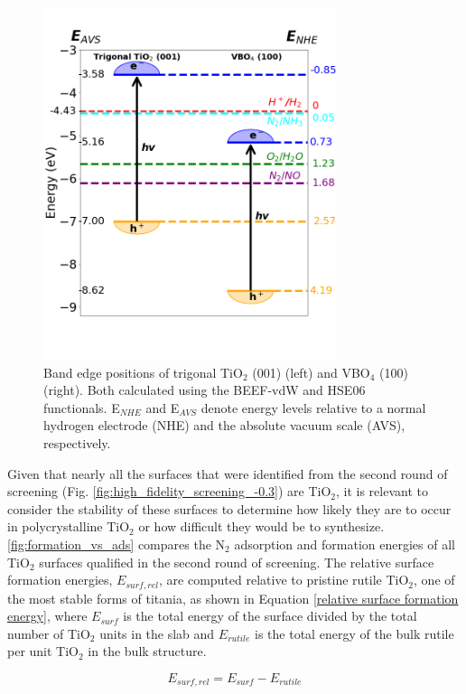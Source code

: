 \begin{figure}[h]
\centering
\includegraphics[width=8.6cm]{figures/metal_oxide_figures/Figure 8.png}

\caption{Band edge positions of trigonal TiO$_2$ (001) (left) and VBO$_4$ (100) (right). Both calculated using the BEEF-vdW and HSE06 functionals. E$_{NHE}$ and E$_{AVS}$ denote energy levels relative to a normal hydrogen electrode (NHE) and the absolute vacuum scale (AVS), respectively.
 }
\label{fig:bandgap_alignment}
\end{figure}

 
Given that nearly all the surfaces that were identified from the second round of screening (Fig. 
\ref{fig:high_fidelity_screening_-0.3}) are TiO$_2$, it is relevant to consider the stability of these surfaces to determine how likely they are to occur in polycrystalline TiO$_2$ or how difficult they would be to synthesize. \ref{fig:formation_vs_ads} compares the N$_2$ adsorption and formation energies of all TiO$_2$ surfaces qualified in the second round of screening. The relative surface formation energies, $E_{surf,rel}$, are computed relative to pristine rutile TiO$_2$, one of the most stable forms of titania, as shown in Equation \ref{relative surface formation energy}, where $E_{surf}$ is the total energy of the surface divided by the total number of TiO$_2$ units in the slab and $E_{rutile}$ is the total energy of the bulk rutile per unit TiO$_2$ in the bulk structure.

\begin{equation}
E_{surf, rel} = E_{surf} - E_{rutile}
\label{relative surface formation energy}
\end{equation} 


